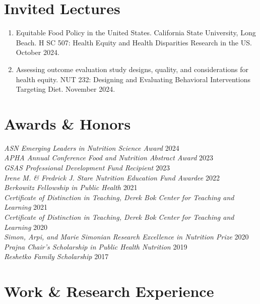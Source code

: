 \documentclass{cv_style}
\begin{document}
\section{Invited Lectures}
\begin{enumerate}[leftmargin = 2em]
    \item Equitable Food Policy in the United States. California State University, Long Beach. H SC 507: Health Equity and Health Disparities Research in the US. October 2024.
    \item \parskip 1pt Assessing outcome evaluation study designs, quality, and considerations for health equity. NUT 232: Designing and Evaluating Behavioral Interventions Targeting Diet. November 2024.
\end{enumerate}



\section{Awards \& Honors}

\textit{ASN Emerging Leaders in Nutrition Science Award} \hfill {2024}\\
\textit{APHA Annual Conference Food and Nutrition Abstract Award} \hfill {2023}\\
\textit{GSAS Professional Development Fund Recipient} \hfill {2023}\\
\textit{Irene M. \& Fredrick J. Stare Nutrition Education Fund Awardee} \hfill {2022}\\
\textit{Berkowitz Fellowship in Public Health} \hfill {2021}\\
\textit{Certificate of Distinction in Teaching, Derek Bok Center for Teaching and Learning} \hfill {2021}\\
\textit{Certificate of Distinction in Teaching, Derek Bok Center for Teaching and Learning} \hfill {2020}\\
\textit{Simon, Arpi, and Marie Simonian Research Excellence in Nutrition Prize} \hfill {2020} \\
\textit{Prajna Chair's Scholarship in Public Health Nutrition} \hfill 2019 \\
\textit{Reshetko Family Scholarship} \hfill 2017


\section{Work \& Research Experience}
\end{document}

